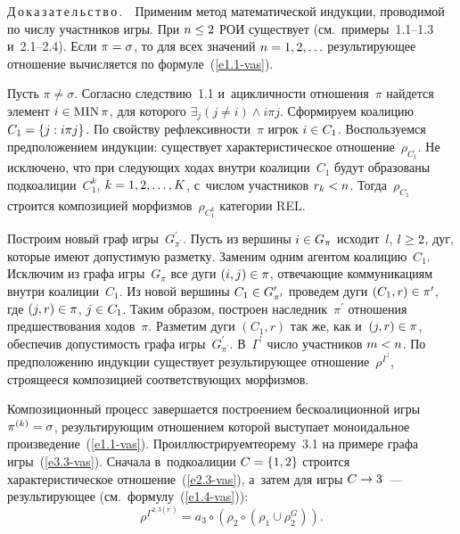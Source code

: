 \begin{multicols}{2}
    \smallskip
    
    \noindent
    Д\,о\,к\,а\,з\,а\,т\,е\,л\,ь\,с\,т\,в\,о\,.\ \  Применим метод математической 
индукции, проводимой по чис\-лу участников игры. При $n\hm\leq 2$ 
РОИ существует (см.\ примеры~1.1--1.3 и~2.1--2.4). Если 
$\pi\hm=\sigma$, то для всех значений $n\hm= 1,2,\ldots$ ре\-зуль\-ти\-ру\-ющее 
отношение вы\-чис\-ля\-ет\-ся по фор\-му\-ле~(\ref{e1.1-vas}). 
    
    Пусть $\pi\not=\sigma$. Согласно следствию~1.1 и~ацик\-лич\-ности 
отношения~$\pi$ найдется элемент $i\hm\in \mathrm{MIN}\, \pi$, для которого $\exists_j (j\not= 
i) \wedge i\pi j$. Сформируем коалицию $C_1\hm= \{j: i\pi j\}$. По свойству 
реф\-лек\-сив\-ности~$\pi$ игрок $i\hm\in C_1$. Воспользуемся предположением 
индукции: существует характеристическое отношение~$\rho_{C_1}$. Не 
исключено, что при сле\-ду\-ющих ходах внут\-ри коалиции~$C_1$ будут образованы 
подкоалиции~$C_1^k$, $k\hm= 1,2,\ldots , K$, с~чис\-лом участников $r_k\hm <n$. 
Тогда~$\rho_{C_1}$ строится композицией морфизмов~$\rho_{C_1^k}$ категории 
REL.
    
    Построим новый граф игры~$G_{\pi^\prime}^\prime$. Пусть из вершины $i\hm\in G_\pi$ 
исходит~$l$, $l\hm\geq 2$, дуг, которые имеют до\-пус\-ти\-мую разметку. Заменим 
одним агентом коалицию~$C_1$. Ис\-клю\-чим из графа игры~$G_\pi$ все дуги 
$(i,j)\hm\in\pi$, от\-ве\-ча\-ющие коммуникациям внут\-ри коалиции~$C_1$. Из новой 
вершины $C_1\hm\in G_{\pi^\prime}^\prime$ проведем дуги $(C_1,r)\hm\in \pi^\prime$, где 
$(j,r)\hm\in \pi$, $j\hm\in C_1$. Таким образом, по\-стро\-ен наследник~$\pi^\prime$ 
отношения предшествования ходов~$\pi$. Разметим дуги $(C_1,r)$ так же, как 
и~$(j,r)\hm\in\pi$, обеспечив до\-пус\-ти\-мость графа игры~$G^\prime_{\pi^\prime}$. 
В~$\Gamma^\prime$ чис\-ло участников $m\hm<n$. По предположению индукции 
существует ре\-зуль\-ти\-ру\-ющее отношение~$\rho^{\Gamma^\prime}$, стро\-яще\-еся 
композицией соответствующих морфизмов. 
    
    Композиционный процесс завершается построением бескоалиционной игры 
$\pi^{(k)} \hm=\sigma$, ре\-зуль\-ти\-ру\-ющим отношением которой выступает 
моноидальное произведение~(\ref{e1.1-vas}). Про\-ил\-люст\-ри\-ру\-ем\linebreak тео\-ре\-му~3.1 на 
примере графа игры~(\ref{e3.3-vas}). Сначала в~подкоалиции $C\hm= \{1,2\}$ 
строится характеристическое отношение~(\ref{e2.3-vas}), а~затем для игры 
$C\hm\to 3$~--- ре\-зуль\-ти\-ру\-ющее (см.\ фор\-му\-лу~(\ref{e1.4-vas})):
    \begin{equation}
    \rho^{\Gamma^{2,3(\pi^\prime)}} =a_3\circ \left(\rho_2\circ \left( \rho_1\cup 
\rho_2^G\right)\right).
    \label{e3.3-1-vas}
    \end{equation}
    

\end{multicols}
